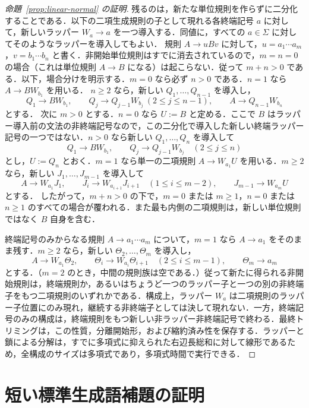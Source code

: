 \documentclass[11pt,a4paper]{ltjsarticle}
\theoremstyle{remark}
\theoremstyle{plain}
\begin{document}
\begin{proof}[命題~\ref{prop:linear-normal} の証明]
残るのは，新たな単位規則を作らずに二分化することである．以下の二項生成規則の子として現れる各終端記号 $a$ に対して，新しいラッパー $W_a\to a$ を一つ導入する．同値に，すべての $a\in\Sigma$ に対してそのようなラッパーを導入してもよい．
規則 $A\to uBv$ に対して，$u=a_1\cdots a_m$，$v=b_1\cdots b_n$ と書く．非開始単位規則はすでに消去されているので，$m=n=0$ の場合（これは単位規則 $A\to B$ になる）は起こらない．従って $m+n>0$ である．以下，場合分けを明示する．$m=0$ なら必ず $n>0$ である．$n=1$ なら $A\to BW_{b_1}$ を用いる．
$n\ge2$ なら，新しい $Q_1,\ldots,Q_{n-1}$ を導入し，
\[
 Q_1\to BW_{b_1},\qquad
 Q_j\to Q_{j-1}W_{b_j}\ (2\le j\le n-1),\qquad
 A\to Q_{n-1}W_{b_n}
\]
とする．
次に $m>0$ とする．$n=0$ なら $U:=B$ と定める．ここで $B$ はラッパー導入前の文法の非終端記号なので，この二分化で導入した新しい終端ラッパー記号の一つではない．$n>0$ なら新しい $Q_1,\ldots,Q_n$ を導入して
\[
 Q_1\to BW_{b_1},\qquad
 Q_j\to Q_{j-1}W_{b_j}\quad(2\le j\le n)
\]
とし，$U:=Q_n$ とおく．$m=1$ なら単一の二項規則 $A\to W_{a_1}U$ を用いる．$m\ge2$ なら，新しい $J_1,\ldots,J_{m-1}$ を導入して
\[
 A\to W_{a_1}J_1,\qquad
 J_i\to W_{a_{i+1}}J_{i+1}\quad(1\le i\le m-2),\qquad
 J_{m-1}\to W_{a_m}U
\]
とする．
したがって，$m+n>0$ の下で，$m=0$ または $m\ge1$，$n=0$ または $n\ge1$ のすべての場合が覆われる．また最も内側の二項規則は，新しい単位規則ではなく $B$ 自身を含む．

終端記号のみからなる規則 $A\to a_1\cdots a_m$ について，$m=1$ なら $A\to a_1$ をそのまま残す．$m\ge2$ なら，新しい
$\Theta_2,\ldots,\Theta_m$ を導入し，
\[
 A\to W_{a_1}\Theta_2,\qquad
 \Theta_i\to W_{a_i}\Theta_{i+1}\quad(2\le i\le m-1),\qquad
 \Theta_m\to a_m
\]
とする．（$m=2$ のとき，中間の規則族は空である．）従って新たに得られる非開始規則は，終端規則か，あるいはちょうど一つのラッパー子と一つの別の非終端子をもつ二項規則のいずれかである．構成上，ラッパー $W_a$ は二項規則のラッパー子位置にのみ現れ，継続する非終端子としては決して現れない．一方，終端記号のみの構成は，終端規則をもつ新しい非ラッパー非終端記号で終わる．最終トリミングは，この性質，分離開始形，および縮約済み性を保存する．ラッパーと鎖による分解は，すでに多項式に抑えられた右辺長総和に対して線形であるため，全構成のサイズは多項式であり，多項式時間で実行できる．
\end{proof}

\section{短い標準生成語補題の証明}
\label{app:linear-short-proof}
\end{document}
